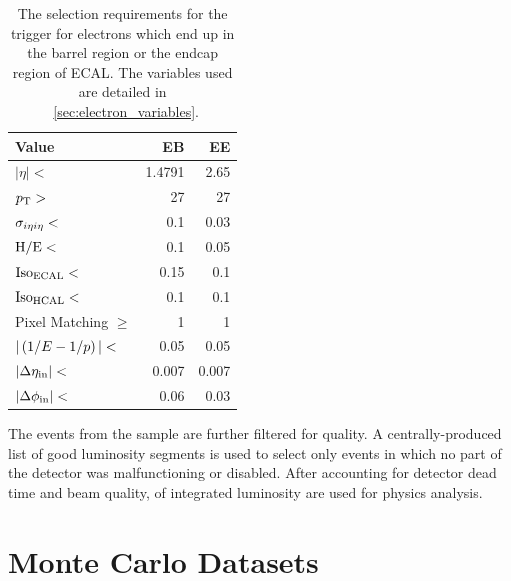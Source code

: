 \begin{table}[h]
\centering
{}
\begin{center}
    \begin{tabular}{@{}l r r@{}}
        \toprule
        Value                      & EB     & EE     \\
        \midrule
        $|\eta| <$                 & 1.4791 & 2.65   \\
        $p_{\mathrm{T}} >$                    & 27     & 27     \\
        $\sigma_{i \eta i \eta} <$         & 0.1    & 0.03   \\
        $\text{H}/\text{E} <$                & 0.1    & 0.05   \\
        $\text{Iso}_{\text{ECAL}} <$               & 0.15   & 0.1    \\
        $\text{Iso}_{\text{HCAL}} <$               & 0.1    & 0.1    \\
        Pixel Matching $\ge$       & 1      & 1      \\
        $|\left( 1/E - 1/p \right)| <$              & 0.05   & 0.05   \\
        $|\Delta \eta_{\text{in}}| <$              & 0.007  & 0.007  \\
        $|\Delta \phi_{\text{in}}| <$              & 0.06   & 0.03   \\
        \bottomrule
    \end{tabular}
\end{center}
\caption[
    The selection requirements for the \SingleElectronTrigger trigger.
]{
    The selection requirements for the \SingleElectronTrigger trigger for
    electrons which end up in the barrel region or the endcap region of ECAL.
    The variables used are detailed in \SEC~\ref{sec:electron_variables}.
}
\label{table:wp80}
\end{table}

The events from the \SingleElectron sample are further filtered for quality. A
centrally-produced list of good luminosity segments is used to select only
events in which no part of the detector was malfunctioning or disabled. After
accounting for detector dead time and beam quality, \GoodLumiNumber of
integrated luminosity are used for physics analysis.

\section{Monte Carlo Datasets}
\label{ssec:monte_carlo}


